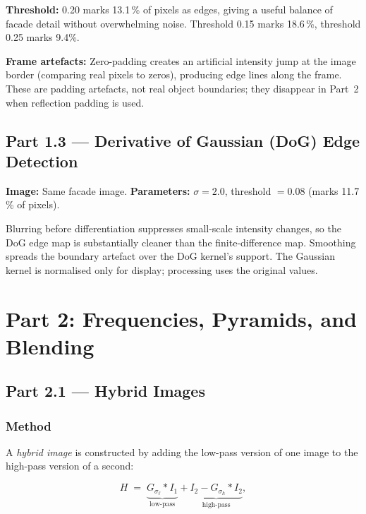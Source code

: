\documentclass[12pt,a4paper]{article}
\begin{document}
\textbf{Threshold:} 0.20 marks 13.1\,\% of pixels as edges, giving a useful
balance of facade detail without overwhelming noise.  Threshold 0.15 marks
18.6\,\%, threshold 0.25 marks 9.4\%.

\textbf{Frame artefacts:} Zero-padding creates an artificial intensity jump at
the image border (comparing real pixels to zeros), producing edge lines along
the frame.  These are padding artefacts, not real object boundaries; they
disappear in Part~2 when reflection padding is used.

\subsection{Part 1.3 \texorpdfstring{---}{-} Derivative of Gaussian (DoG) Edge Detection}

\textbf{Image:} Same facade image.
\textbf{Parameters:} $\sigma=2.0$, threshold $=0.08$ (marks 11.7\,\% of pixels).

Blurring before differentiation suppresses small-scale intensity changes, so
the DoG edge map is substantially cleaner than the finite-difference map.
Smoothing spreads the boundary artefact over the DoG kernel's support.  The
Gaussian kernel is normalised only for display; processing uses the original
values.

\section{Part 2: Frequencies, Pyramids, and Blending}

\subsection{Part 2.1 \texorpdfstring{---}{-} Hybrid Images}
\label{sec:21}

\subsubsection{Method}

A \emph{hybrid image} is constructed by adding the low-pass version of one
image to the high-pass version of a second:

\begin{equation}
  H \;=\; \underbrace{G_{\sigma_{\ell}} * I_1}_{\text{low-pass}}
        + \underbrace{I_2 - G_{\sigma_{h}} * I_2}_{\text{high-pass}},
  \label{eq:hybrid}
\end{equation}
\end{document}
